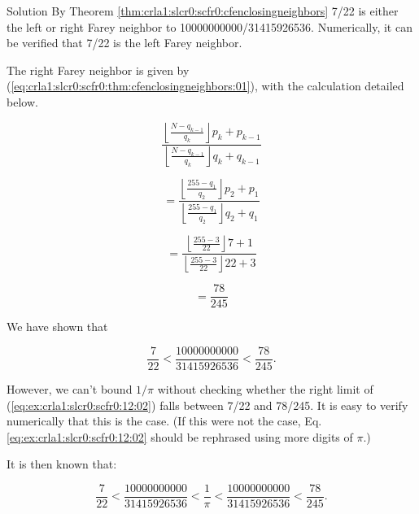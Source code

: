 \begin{vworkexampleparsection}{Solution}
By Theorem \ref{thm:crla1:slcr0:scfr0:cfenclosingneighbors} 7/22 is either
the left or right Farey neighbor to 10000000000/31415926536.  Numerically,
it can be verified that 7/22 is the left Farey neighbor.

The right Farey neighbor is given by 
(\ref{eq:crla1:slcr0:scfr0:thm:cfenclosingneighbors:01}), with the calculation
detailed below.

\begin{equation}
\label{eq:ex:crla1:slcr0:scfr0:12:10a}
\frac{{\displaystyle{\left\lfloor {\frac{{N - q_{k - 1} }}{{q_k }}} \right\rfloor}
 p_k  + p_{k - 1} }}{{\displaystyle{\left\lfloor {\frac{{N - q_{k - 1} }}{{q_k }}}
 \right\rfloor} q_k  + q_{k - 1} }}
\end{equation}

\begin{equation}
\label{eq:ex:crla1:slcr0:scfr0:12:10b}
= \frac{{\displaystyle{\left\lfloor {\frac{{255 - q_{1} }}{{q_{2} }}} \right\rfloor}
 p_{2}  + p_{1} }}{{\displaystyle{\left\lfloor {\frac{{255 - q_{1} }}{{q_{2} }}}
 \right\rfloor} q_{2}  + q_{1} }}
\end{equation}

\begin{equation}
\label{eq:ex:crla1:slcr0:scfr0:12:10c}
= \frac{{\displaystyle{\left\lfloor {\frac{{255 - 3 }}{{22 }}} \right\rfloor}
 7  + 1 }}{{\displaystyle{\left\lfloor {\frac{{255 - 3 }}{{22 }}}
 \right\rfloor} 22  + 3 }}
\end{equation}

\begin{equation}
\label{eq:ex:crla1:slcr0:scfr0:12:10d}
= \frac{78}{245}
\end{equation}

We have shown that

\begin{equation}
\label{eq:ex:crla1:slcr0:scfr0:12:20}
\frac{7}{22}
<
\frac{10000000000}{31415926536}
<
\frac{78}{245} .
\end{equation}

However, we can't bound $1/\pi$ without checking whether the right
limit of 
(\ref{eq:ex:crla1:slcr0:scfr0:12:02}) falls between 
7/22 and 78/245.  It is easy to verify numerically that this is the case.
(If this were not the case, Eq. \ref{eq:ex:crla1:slcr0:scfr0:12:02} should
be rephrased using more digits of $\pi$.)

It is then known that:

\begin{equation}
\label{eq:ex:crla1:slcr0:scfr0:12:21}
\frac{7}{22}
<
\frac{10000000000}{31415926536}
<
\frac{1}{\pi}
<
\frac{10000000000}{31415926536}
<
\frac{78}{245} .
\end{equation}


\end{vworkexampleparsection}
